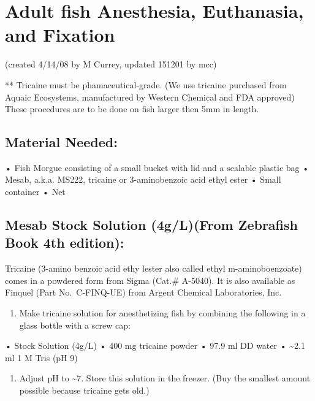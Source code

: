 \documentclass[
]{book}
\providecommand{\tightlist}{%
  \setlength{\itemsep}{0pt}\setlength{\parskip}{0pt}}
\begin{document}
\hypertarget{adult-fish-anesthesia-euthanasia-and-fixation}{%
\section{Adult fish Anesthesia, Euthanasia, and Fixation}\label{adult-fish-anesthesia-euthanasia-and-fixation}}

(created 4/14/08 by M Currey, updated 151201 by mcc)

** Tricaine must be phamaceutical-grade. (We use tricaine purchased from Aquaic Ecosystems, manufactured by Western Chemical and FDA approved)
These procedures are to be done on fish larger then 5mm in length.

\hypertarget{material-needed}{%
\subsection{Material Needed:}\label{material-needed}}

• Fish Morgue consisting of a small bucket with lid and a sealable plastic bag
• Mesab, a.k.a. MS222, tricaine or 3-aminobenzoic acid ethyl ester
• Small container
• Net

\hypertarget{mesab-stock-solution-4glfrom-zebrafish-book-4th-edition}{%
\subsection{Mesab Stock Solution (4g/L)(From Zebrafish Book 4th edition):}\label{mesab-stock-solution-4glfrom-zebrafish-book-4th-edition}}

Tricaine (3-amino benzoic acid ethy lester also called ethyl m-aminoboenzoate) comes in a powdered form from Sigma (Cat.\# A-5040). It is also available as Finquel (Part No.~C-FINQ-UE) from Argent Chemical Laboratories, Inc.~

\begin{enumerate}
\def\labelenumi{\arabic{enumi}.}
\tightlist
\item
  Make tricaine solution for anesthetizing fish by combining the following in a glass bottle with a screw cap:
\end{enumerate}

• Stock Solution (4g/L)
• 400 mg tricaine powder
• 97.9 ml DD water
• \textasciitilde2.1 ml 1 M Tris (pH 9)

\begin{enumerate}
\def\labelenumi{\arabic{enumi}.}
\setcounter{enumi}{1}
\tightlist
\item
  Adjust pH to \textasciitilde7. Store this solution in the freezer. (Buy the smallest amount possible because tricaine gets old.)
\end{enumerate}
\end{document}
